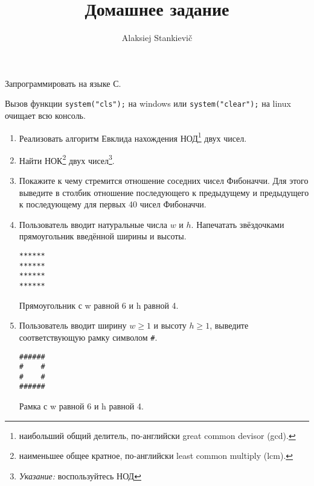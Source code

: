 \documentclass[12pt]{article}
\author{Alaksiej Stankievič}
\title{Домашнее задание}
\begin{document}


 Запрограммировать на языке С.
 
 Вызов функции \verb|system("cls");| на windows или \verb|system("clear");| на  linux очищает всю консоль.
 \begin{enumerate}
  \item Реализовать алгоритм Евклида нахождения НОД\footnote{наибольший общий делитель, по-английски great common 
devisor (gcd).} двух чисел.
  \item Найти НОК\footnote{наименьшее общее кратное, по-английски least common multiply (lcm).} двух 
чисел\footnote{\textit{Указание:} воспользуйтесь НОД}.
  \item Покажите к чему стремится отношение соседних чисел Фибоначчи. Для этого выведите в столбик отношение 
последующего к предыдущему и предыдущего к последующему для первых 40 чисел Фибоначчи.

  \item Пользователь вводит натуральные числа $w$ и $h$. Напечатать звёздочками прямоугольник введённой ширины и высоты.
  \begin{listing}[H]
\begin{center}
\begin{verbatim}
******
******
******
******
\end{verbatim}
\end{center}

\caption{Прямоугольник с w равной 6 и h равной 4.}
\label{lst:exampleSqure}
\end{listing}
  \item Пользователь вводит ширину $w\geq{}1$ и высоту $h\geq{}1$, выведите соответствующую рамку символом \verb|#|.
    \begin{listing}[H]
\begin{center}
\begin{verbatim}
######
#    #
#    #
######
\end{verbatim}
\end{center}

\caption{Рамка с w равной 6 и h равной 4.}
\label{lst:exampleFrame}
\end{listing}

  
 \end{enumerate}
\end{document}
